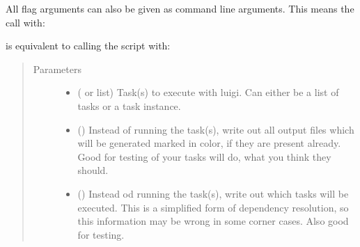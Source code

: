 \documentclass[letterpaper,10pt,english]{sphinxmanual}
\begin{document}
\begin{fulllineitems}
\begin{sphinxVerbatim}[commandchars=\\\{\}]
   
    \PYG{p}{[}    \PYG{p}{]}
\end{sphinxVerbatim}

All flag arguments can also be given as command line arguments.
This means the call with:

\begin{sphinxVerbatim}[commandchars=\\\{\}]
 
\end{sphinxVerbatim}

is equivalent to calling the script with:

\begin{sphinxVerbatim}[commandchars=\\\{\}]
  
\end{sphinxVerbatim}
\begin{quote}\begin{description}
\item[{Parameters}] \leavevmode\begin{itemize}
\item {} 
 ({\hyperref[\detokenize{documentation/api:b2luigi.Task}]{}} or list) \textendash{} Task(s) to execute with luigi.
Can either be a list of tasks or a task instance.

\item {} 
 (\sphinxstyleliteralemphasis{\sphinxupquote{, }}) \textendash{} Instead of running the task(s), write out all output files
which will be generated marked in color, if they are present already.
Good for testing of your tasks will do, what you think they should.

\item {} 
 (\sphinxstyleliteralemphasis{\sphinxupquote{, }}) \textendash{} Instead od running the task(s), write out which tasks will
be executed. This is a simplified form of dependency resolution, so this
information may be wrong in some corner cases. Also good for testing.


\end{itemize}
\end{description}
\end{quote}
\end{fulllineitems}
\end{document}
